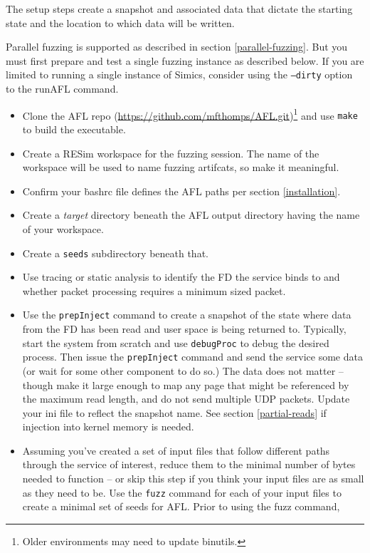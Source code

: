 \documentclass[titlepage]{article}
\begin{document}
The setup steps create a snapshot and associated data that dictate the starting state and the location
to which data will be written.  

Parallel fuzzing is supported as described in section \ref{parallel-fuzzing}.  But you must first prepare and
test a single fuzzing instance as described below.  If you are limited to running a single instance of Simics, consider using
the {\tt --dirty} option to the runAFL command.

\begin{itemize}
\item Clone the AFL repo (\url{https://github.com/mfthomps/AFL.git})\footnote{Older environments may need to update binutils.} and use {\tt make} to build the executable.
\item Create a RESim workspace for the fuzzing session.  The name of the workspace will be used
to name fuzzing artifcats, so make it meaningful.
\item Confirm your {\.bashrc} file defines the AFL paths per section \ref{installation}.
\item Create a \textit{target} directory beneath the AFL output directory having the name of your workspace.
\item Create a {\tt seeds} subdirectory beneath that. 
\item Use tracing or static analysis to identify the FD the service binds to and whether packet processing requires a minimum sized packet.
\item Use the {\tt prepInject} command to create a snapshot of the state where data from the FD has been read and user space is being returned to.
Typically, start the system from scratch and use {\tt debugProc} to debug the desired process.  Then issue the {\tt prepInject} command and
send the service some data (or wait for some other component to do so.)  The data does not matter -- though make it large enough
to map any page that might be referenced by the maximum read length, and do not send multiple UDP packets.  Update your ini file to reflect
the snapshot name.  See section \ref{partial-reads} if injection into kernel memory is needed.
\item Assuming you've created a set of input files that follow different paths through the service of interest, 
reduce them to the minimal number of bytes needed to function -- or skip this step if you think your input files are
as small as they need to be.
Use the {\tt fuzz} command for each of your input files to create a minimal set of seeds for AFL. Prior to using the fuzz command,

\end{itemize}
\end{document}
